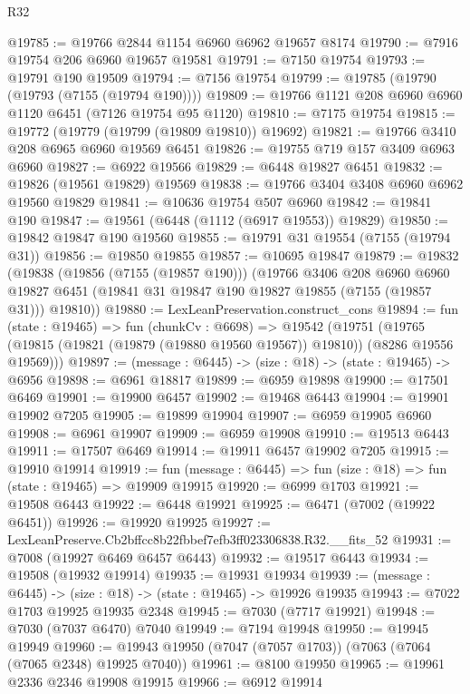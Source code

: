 \begin{lexlean}{R32}
\begin{coremodule}
@19785 := @19766 @2844 @1154 @6960 @6962 @19657 @8174
@19790 := @7916 @19754 @206 @6960 @19657 @19581
@19791 := @7150 @19754
@19793 := @19791 @190 @19509
@19794 := @7156 @19754
@19799 := @19785 (@19790 (@19793 (@7155 (@19794 @190))))
@19809 := @19766 @1121 @208 @6960 @6960 @1120 @6451 (@7126 @19754 @95 @1120)
@19810 := @7175 @19754
@19815 := @19772 (@19779 (@19799 (@19809 @19810)) @19692)
@19821 := @19766 @3410 @208 @6965 @6960 @19569 @6451
@19826 := @19755 @719 @157 @3409 @6963 @6960
@19827 := @6922 @19566
@19829 := @6448 @19827 @6451
@19832 := @19826 (@19561 @19829) @19569
@19838 := @19766 @3404 @3408 @6960 @6962 @19560 @19829
@19841 := @10636 @19754 @507 @6960
@19842 := @19841 @190
@19847 := @19561 (@6448 (@1112 (@6917 @19553)) @19829)
@19850 := @19842 @19847 @190 @19560
@19855 := @19791 @31 @19554 (@7155 (@19794 @31))
@19856 := @19850 @19855
@19857 := @10695 @19847
@19879 := @19832
    (@19838
      (@19856 (@7155 (@19857 @190)))
      (@19766
        @3406
        @208
        @6960
        @6960
        @19827
        @6451
        (@19841 @31 @19847 @190 @19827 @19855 (@7155 (@19857 @31)))
        @19810))
@19880 := LexLeanPreservation.construct_cons
@19894 := fun (state : @19465) =>
  fun (chunkCv : @6698) =>
  @19542
    (@19751 (@19765 (@19815 (@19821 (@19879 (@19880 @19560 @19567)) @19810)) (@8286 @19556 @19569)))
@19897 := (message : @6445) -> (size : @18) -> (state : @19465) -> @6956
@19898 := @6961 @18817
@19899 := @6959 @19898
@19900 := @17501 @6469
@19901 := @19900 @6457
@19902 := @19468 @6443
@19904 := @19901 @19902 @7205
@19905 := @19899 @19904
@19907 := @6959 @19905 @6960
@19908 := @6961 @19907
@19909 := @6959 @19908
@19910 := @19513 @6443
@19911 := @17507 @6469
@19914 := @19911 @6457 @19902 @7205
@19915 := @19910 @19914
@19919 := fun (message : @6445) => fun (size : @18) => fun (state : @19465) => @19909 @19915
@19920 := @6999 @1703
@19921 := @19508 @6443
@19922 := @6448 @19921
@19925 := @6471 (@7002 (@19922 @6451))
@19926 := @19920 @19925
@19927 := LexLeanPreserve.Cb2bffcc8b22fbbef7efb3ff023306838.R32.__fits_52
@19931 := @7008 (@19927 @6469 @6457 @6443)
@19932 := @19517 @6443
@19934 := @19508 (@19932 @19914)
@19935 := @19931 @19934
@19939 := (message : @6445) -> (size : @18) -> (state : @19465) -> @19926 @19935
@19943 := @7022 @1703 @19925 @19935 @2348
@19945 := @7030 (@7717 @19921)
@19948 := @7030 (@7037 @6470) @7040
@19949 := @7194 @19948
@19950 := @19945 @19949
@19960 := @19943 @19950 (@7047 (@7057 @1703)) (@7063 (@7064 (@7065 @2348) @19925 @7040))
@19961 := @8100 @19950
@19965 := @19961 @2336 @2346 @19908 @19915
@19966 := @6912 @19914

\end{coremodule}
\end{lexlean}
